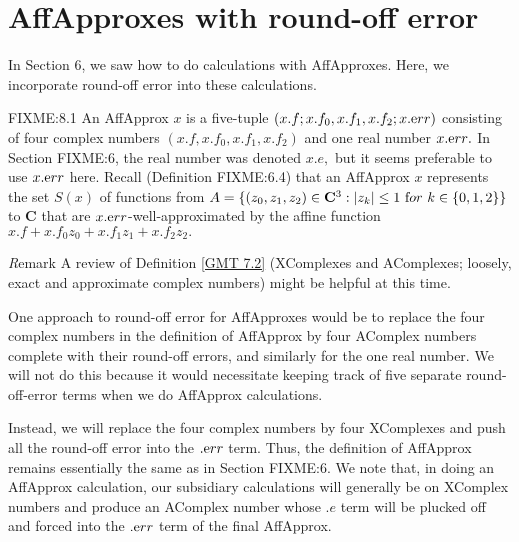 \chapter{AffApproxes with round-off error}
 
In Section 6, we saw how to do calculations with AffApproxes.  Here, we incorporate round-off error into
these calculations.  

\begin{conventions}{ {\textrm FIXME:8.1}}
An AffApprox $x$ is a five-tuple
$(x.f; x.f_0,x.f_1,x.f_2; x.{\textrm err})$
consisting of four complex numbers $(x.f, x.f_0,x.f_1, x.f_2)$ and one real number $x.{\textrm err}.$  In Section FIXME:6, the
real number was denoted $x.e,$ but it seems preferable to use $x.{\textrm err}$ here.  Recall (Definition FIXME:6.4)
that an AffApprox $x$ represents the set $S(x)$ of functions from $A = \{(z_0,z_1,z_2) \in {\mathbf C}^3 : |z_k| \le 1 \
{\textrm for} \ k \in \{0,1,2\}\}$ to ${\mathbf C}$ that are $x.{\textrm err}$-well-approximated by the affine function
$x.f + x.f_0 z_0 + x.f_1 z_1 + x.f_2 z_2.$
\end{conventions}

{\textit Remark} \label{GMT 8.2}
A review of Definition \ref{GMT 7.2} (XComplexes and AComplexes; loosely, exact and approximate complex numbers) might be helpful at this time.

One approach to round-off error for AffApproxes would be to replace the four complex numbers in the definition of AffApprox by four AComplex numbers complete with their round-off errors, and similarly for the one real number.  We will not do this because it would necessitate keeping track of five separate round-off-error terms when we do AffApprox calculations.

Instead, we will 
replace the four complex numbers by four XComplexes and push all the round-off error into the $.{\textrm err}$ term.  
Thus, the definition of AffApprox remains 
essentially the same as in Section FIXME:6.
We note that, in doing an AffApprox calculation, our subsidiary calculations will generally be on XComplex numbers and produce an AComplex number whose $.e$ term will be plucked off and forced into the $.{\textrm err}$ term of the final AffApprox.

